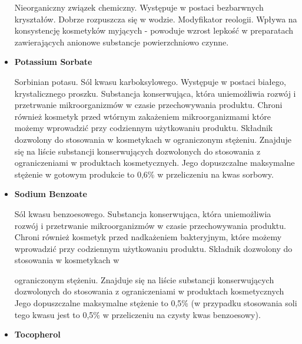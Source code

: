 \begin{itemize}
Nieorganiczny związek chemiczny. Występuje w postaci bezbarwnych kryształów. Dobrze rozpuszcza się w wodzie. Modyfikator reologii. Wpływa na konsystencję kosmetyków myjących - powoduje wzrost lepkość w preparatach zawierających anionowe substancje powierzchniowo czynne.

\item \textbf{Potassium Sorbate}

Sorbinian potasu. Sól kwasu karboksylowego. Występuje w postaci białego, krystalicznego proszku. Substancja konserwująca, która uniemożliwia rozwój i przetrwanie mikroorganizmów w czasie przechowywania produktu. Chroni również kosmetyk przed wtórnym zakażeniem mikroorganizmami które możemy wprowadzić przy codziennym użytkowaniu produktu. Składnik dozwolony do stosowania w kosmetykach w ograniczonym stężeniu. Znajduje się na liście substancji konserwujących dozwolonych do stosowania z ograniczeniami w produktach kosmetycznych. Jego dopuszczalne maksymalne stężenie w gotowym produkcie to 0,6\% w przeliczeniu na kwas sorbowy.

\item \textbf{Sodium Benzoate}

Sól kwasu benzoesowego. Substancja konserwująca, która uniemożliwia rozwój i przetrwanie mikroorganizmów w czasie przechowywania produktu. Chroni również kosmetyk przed nadkażeniem bakteryjnym, które możemy wprowadzić przy codziennym użytkowaniu produktu. Składnik dozwolony do stosowania w kosmetykach w

ograniczonym stężeniu. Znajduje się na liście substancji konserwujących dozwolonych do stosowania z ograniczeniami w produktach kosmetycznych Jego dopuszczalne maksymalne stężenie to 0,5\% (w przypadku stosowania soli tego kwasu jest to 0,5\% w przeliczeniu na czysty kwas benzoesowy).

\item \textbf{Tocopherol}


\end{itemize}
